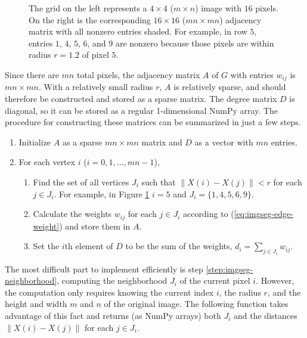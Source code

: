 \begin{figure}[H]

\caption{The grid on the left represents a $4\times4$ ($m \times n$) image with $16$ pixels.
On the right is the corresponding $16 \times 16$ ($mn \times mn$) adjacency matrix with all nonzero entries shaded.
For example, in row $5$, entries $1$, $4$, $5$, $6$, and $9$ are nonzero because those pixels are within radius $r=1.2$ of pixel $5$.}
\label{fig:imgseg-adjacency-tikz}
\end{figure}

Since there are $mn$ total pixels, the adjacency matrix $A$ of $G$ with entries $w_{ij}$ is $mn\times mn$.
With a relatively small radius $r$, $A$ is relatively sparse, and should therefore be constructed and stored as a sparse matrix.
The degree matrix $D$ is diagonal, so it can be stored as a regular 1-dimensional NumPy array.
The procedure for constructing these matrices can be summarized in just a few steps.
\begin{enumerate}
    \item Initialize $A$ as a sparse $mn\times mn$ matrix and $D$ as a vector with $mn$ entries.
    \item For each vertex $i$ ($i=0,1,\ldots,mn-1$),
    \begin{enumerate}
        \item Find the set of all vertices $J_i$ such that $\|X(i) - X(j)\| < r$ for each $j\in J_i$.
        For example, in Figure \ref{fig:imgseg-adjacency-tikz} $i=5$ and $J_i = \{1,4,5,6,9\}$.
        \label{step:imgseg-neighborhood}
        \item Calculate the weights $w_{ij}$ for each $j\in J_i$ according to (\ref{eq:imgseg-edge-weight}) and store them in $A$.
        \item Set the $i$th element of $D$ to be the sum of the weights, $d_i = \sum_{j\in J_i}w_{ij}$.
    \end{enumerate}
\end{enumerate}

The most difficult part to implement efficiently is step \ref{step:imgseg-neighborhood}, computing the neighborhood $J_i$ of the current pixel $i$.
However, the computation only requires knowing the current index $i$, the radius $r$, and the height and width $m$ and $n$ of the original image.
The following function takes advantage of this fact and returns (as NumPy arrays) both $J_i$ and the distances $\|X(i) - X(j)\|$ for each $j\in J_i$.

